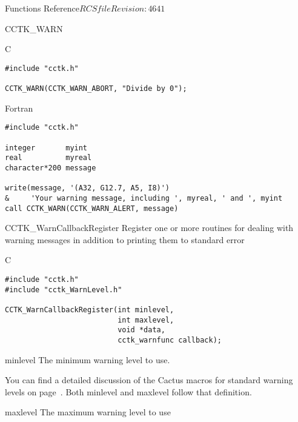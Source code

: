 \begin{cactuspart}{ Functions Reference}{$RCSfile$}{$Revision: 4641 $}
\begin{FunctionDescription}{CCTK\_WARN}
\begin{ExampleSection}
\begin{Example}{C}
\begin{verbatim}
#include "cctk.h"

CCTK_WARN(CCTK_WARN_ABORT, "Divide by 0");
\end{verbatim}
\end{Example}
\begin{Example}{Fortran}
\begin{verbatim}
#include "cctk.h"

integer       myint
real          myreal
character*200 message

write(message, '(A32, G12.7, A5, I8)')
&     'Your warning message, including ', myreal, ' and ', myint
call CCTK_WARN(CCTK_WARN_ALERT, message)
\end{verbatim}
\end{Example}
\end{ExampleSection}
\end{FunctionDescription}


\begin{FunctionDescription}{CCTK\_WarnCallbackRegister}
\label{CCTK-WARNCallbackRegister}
Register one or more routines for dealing with warning messages in
addition to printing them to standard error

\begin{SynopsisSection}
\begin{Synopsis}{C}
\begin{verbatim}
#include "cctk.h"
#include "cctk_WarnLevel.h"

CCTK_WarnCallbackRegister(int minlevel,
                          int maxlevel,
                          void *data,
                          cctk_warnfunc callback);

\end{verbatim}
\end{Synopsis}
\end{SynopsisSection}

\begin{ParameterSection}
\begin{Parameter}{minlevel}
The minimum warning level to use.

You can find a detailed discussion of the Cactus macros for standard
warning levels on page~\pageref{CCTK-VInfo}. Both minlevel and maxlevel follow
that definition.

\end{Parameter}

\begin{Parameter}{maxlevel}
The maximum warning level to use


\end{Parameter}
\end{ParameterSection}
\end{FunctionDescription}
\end{cactuspart}
